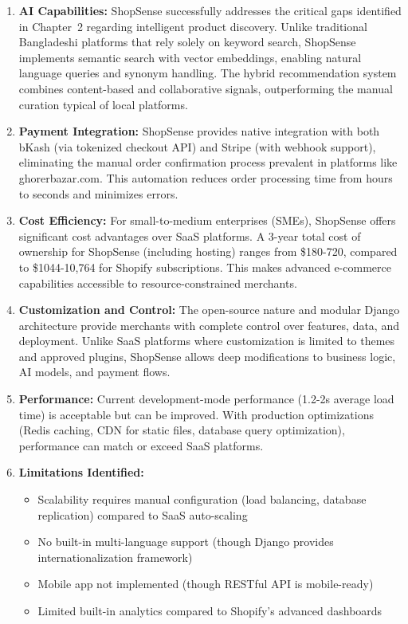 \begin{enumerate}[label=\roman*.]
  \item \textbf{AI Capabilities:} ShopSense successfully addresses the critical gaps identified in Chapter~2 regarding intelligent product discovery. Unlike traditional Bangladeshi platforms that rely solely on keyword search, ShopSense implements semantic search with vector embeddings, enabling natural language queries and synonym handling. The hybrid recommendation system combines content-based and collaborative signals, outperforming the manual curation typical of local platforms.

  \item \textbf{Payment Integration:} ShopSense provides native integration with both bKash (via tokenized checkout API) and Stripe (with webhook support), eliminating the manual order confirmation process prevalent in platforms like ghorerbazar.com. This automation reduces order processing time from hours to seconds and minimizes errors.

  \item \textbf{Cost Efficiency:} For small-to-medium enterprises (SMEs), ShopSense offers significant cost advantages over SaaS platforms. A 3-year total cost of ownership for ShopSense (including hosting) ranges from \$180-720, compared to \$1044-10,764 for Shopify subscriptions. This makes advanced e-commerce capabilities accessible to resource-constrained merchants.

  \item \textbf{Customization and Control:} The open-source nature and modular Django architecture provide merchants with complete control over features, data, and deployment. Unlike SaaS platforms where customization is limited to themes and approved plugins, ShopSense allows deep modifications to business logic, AI models, and payment flows.

  \item \textbf{Performance:} Current development-mode performance (1.2-2s average load time) is acceptable but can be improved. With production optimizations (Redis caching, CDN for static files, database query optimization), performance can match or exceed SaaS platforms.

  \item \textbf{Limitations Identified:}
  \begin{itemize}
    \item Scalability requires manual configuration (load balancing, database replication) compared to SaaS auto-scaling
    \item No built-in multi-language support (though Django provides internationalization framework)
    \item Mobile app not implemented (though RESTful API is mobile-ready)
    \item Limited built-in analytics compared to Shopify's advanced dashboards
  \end{itemize}


\end{enumerate}
